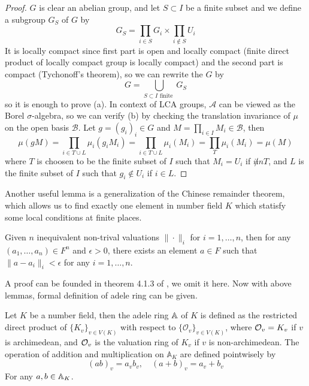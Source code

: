 \begin{proof}
    \(G\) is clear an abelian group, and let \(S \subset I\) be a finite subset and we define a subgroup \(G_S\) of \(G\) by
    \[G_S= \prod_{i \in S}G_i \times \prod_{i \notin S}U_i\]
    It is locally compact since first part is open and locally compact (finite direct product of locally compact group is locally compact) and the second part is compact (Tychonoff's theorem), so we can rewrite the \(G\) by
    \[G = \bigcup_{S \subset I \text{ finite }} G_S\]
    so it is enough to prove (a). In context of LCA groups, \(\mathcal{A}\) can be viewed as the Borel \(\sigma\)-algebra, so we can verify (b) by checking the translation invariance of \(\mu\) on the open basis \(\mathcal{B}\). Let \(g = (g_i)_i \in G\) and \(M = \prod_{i \in I}M_i \in \mathcal{B}\), then
    \[\mu(gM) = \prod_{i \in T \cup L}\mu_i(g_iM_i) = \prod_{i \in T \cup L} \mu_i(M_i) = \prod_{T} \mu_i(M_i) = \mu(M) \]
    where \(T\) is choosen to be the finite subset of \(I\) such that \(M_i = U_i\) if \(i \not in T\), and \(L\) is the finite subset of \(I\) such that \(g_i \notin U_i\) if \(i \in L\).
\end{proof}

Another useful lemma is a generalization of the Chinese remainder theorem, which allows us to find exactly one element in number field \(K\) which statisfy some local conditions at finite places.

\begin{lemma} \label{weakapproximation}
    Given \(n\) inequivalent non-trival valuations \(\|\cdot\|_i\) for \(i = 1,\dots,n\), then for any \((a_1,\dots,a_n) \in F^n\) and \(\epsilon >0\), there exists an element \(a \in F\) such that \(\|a - a_i\|_i < \epsilon\) for any \(i = 1,\dots,n\). 
\end{lemma}

A proof can be founded in theorem 4.1.3 of \cite{koch2000number}, we omit it here. Now with above lemmas, formal definition of adele ring can be given.

\begin{definition}
    Let \(K\) be a number field, then the adele ring \(\mathbb{A}\) of \(K\) is defined as the restricted direct product of \(\{K_v\}_{v \in V(K)}\) with respect to \(\{\mathcal{O}_v\}_{v \in V(K)}\), where \(\mathcal{O}_v = K_v\) if \(v\) is archimedean, and \(\mathcal{O}_v\) is the valuation ring of \(K_v\) if \(v\) is non-archimedean. The operation of addition and multiplication on \(\mathbb{A}_K\) are defined pointwisely by
    \[(ab)_v = a_vb_v, \quad (a+b)_v = a_v+b_v\]
    For any \(a,b \in \mathbb{A}_K\).
\end{definition}

